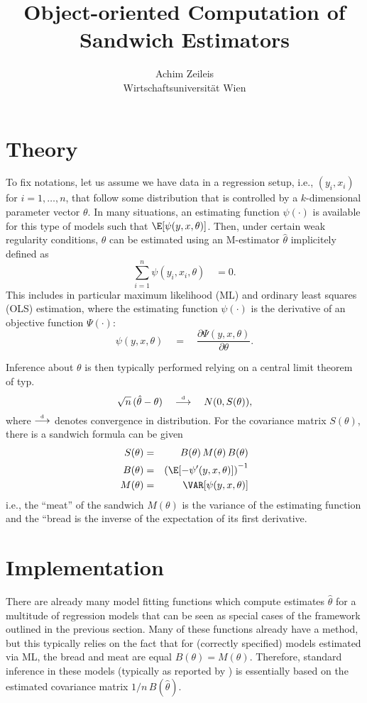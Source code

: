 \documentclass{Z}
\author{Achim Zeileis\\Wirtschaftsuniversit\"at Wien}
\title{Object-oriented Computation of Sandwich Estimators}
\newcommand{\darrow}{\stackrel{\mbox{\tiny \textnormal{d}}}{\longrightarrow}}
\begin{document}


\section{Theory}

To fix notations, let us assume we have data in a regression setup, i.e., 
$(y_i, x_i)$ for $i = 1, \dots, n$, that follow some distribution that is 
controlled by a $k$-dimensional parameter vector $\theta$. In many situations,
an estimating function $\psi(\cdot)$ is available for this type of models
such that $\E[\psi(y, x, \theta)]$. Then, under certain weak regularity
conditions, $\theta$ can be estimated using an M-estimator $\hat \theta$
implicitely defined as
  \[ \sum_{i = 1}^n \psi(y_i, x_i, \theta) \quad = 0. \]
This includes in particular maximum likelihood (ML) and ordinary least
squares (OLS) estimation, where the estimating function $\psi(\cdot)$ is
the derivative of an objective function $\Psi(\cdot)$:
  \[ \psi(y, x, \theta) \quad = \quad \frac{\partial \Psi(y, x, \theta)}{\partial \theta}. \]

Inference about $\theta$ is then typically performed relying on a central
limit theorem of typ.
  \[ \sqrt{n} \, (\hat \theta - \theta) \quad \darrow \quad N(0, S(\theta)), \]
where $\darrow$ denotes convergence in distribution. For the covariance matrix
$S(\theta)$, there is a sandwich formula can be given
\begin{eqnarray*}
  S(\theta) & = & B(\theta) \, M(\theta) \, B(\theta) \\
  B(\theta) & = & \left( \E[ - \psi'(y, x, \theta) ] \right)^{-1} \\
  M(\theta) & = & \VAR[ \psi(y, x, \theta) ]
\end{eqnarray*}
i.e., the ``meat'' of the sandwich $M(\theta)$ is the variance of the estimating
function and the ``bread is the inverse of the expectation of its first derivative.


\section{Implementation}

There are already many model fitting functions which compute estimates $\hat \theta$
for a multitude of regression models that can be seen as special cases of the framework
outlined in the previous section. Many of these functions already have a 
method, but this typically relies on the fact that for (correctly specified) models estimated
via ML, the bread and meat are equal $B(\theta) = M(\theta)$. Therefore, standard inference
in these models (typically as reported by ) is essentially based on the estimated
covariance matrix $1/n \, B(\hat \theta)$.
\end{document}

